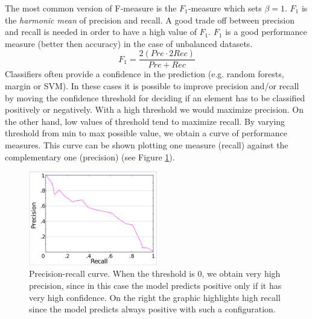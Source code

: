 
The most common version of F-measure is the $F_1$-measure which sets $\beta=1$. $F_1$ is the \textit{harmonic mean} of precision and recall. A good trade off between precision and recall is needed in order to have a high value of $F_1$. $F_1$ is a good performance measure (better then accuracy) in the case of unbalanced datasets.
\begin{equation}
    F_1 = \frac{2(\mathit{Pre} \cdot 2\mathit{Rec})}{\mathit{Pre} + \mathit{Rec}}
\end{equation}
Classifiers often provide a confidence in the prediction (e.g. random forests, margin or SVM). In these cases it is possible to improve precision and/or recall by moving the confidence threshold for deciding if an element has to be classified positively or negatively. With a high threshold we would maximize precision. On the other hand, low values of threshold tend to maximize recall. By varying threshold from min to max possible value, we obtain a curve of performance measures. This curve can be shown plotting one measure (recall) against the complementary one (precision) (see Figure \ref{fig:precisionRecallCurve}).

\begin{figure}
    \centering
    \includegraphics[width=0.5\textwidth]{images/precisionReacall_curve.png}
    \caption{Precision-recall curve. When the threshold is 0, we obtain very high precision, since in this case the model predicts positive only if it has very high confidence. On the right the graphic highlights high recall since the model predicts always positive with such a configuration.}
    \label{fig:precisionRecallCurve}
\end{figure}

